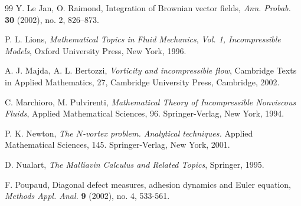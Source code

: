 \documentclass[11pt,a4paper]{article}%
\begin{document}
\begin{thebibliography}{99}
Y. Le Jan, O. Raimond, Integration of Brownian vector
fields, \textit{Ann. Probab.} \textbf{30} (2002), no. 2, 826--873.

P. L. Lions, \textit{Mathematical Topics in Fluid
Mechanics}, \textit{Vol. 1, Incompressible Models}, Oxford University Press,
New York, 1996.

A. J. Majda, A. L. Bertozzi, \textit{Vorticity and
incompressible flow}, Cambridge Texts in Applied Mathematics, 27, Cambridge
University Press, Cambridge, 2002.

C. Marchioro, M. Pulvirenti, \textit{Mathematical Theory
of Incompressible Nonviscous Fluids}, Applied Mathematical Sciences, 96.
Springer-Verlag, New York, 1994.

P. K. Newton,  \textit{ The $N$-vortex problem. Analytical
techniques.}  Applied Mathematical Sciences, 145. Springer-Verlag, New York, 2001.

D. Nualart, \textit{The Malliavin Calculus and Related
Topics}, Springer, 1995.

F. Poupaud, Diagonal defect measures, adhesion dynamics and
Euler equation, \textit{Methods Appl. Anal.} \textbf{9} (2002), no. 4, 533-561.
\end{thebibliography}
\end{document}
